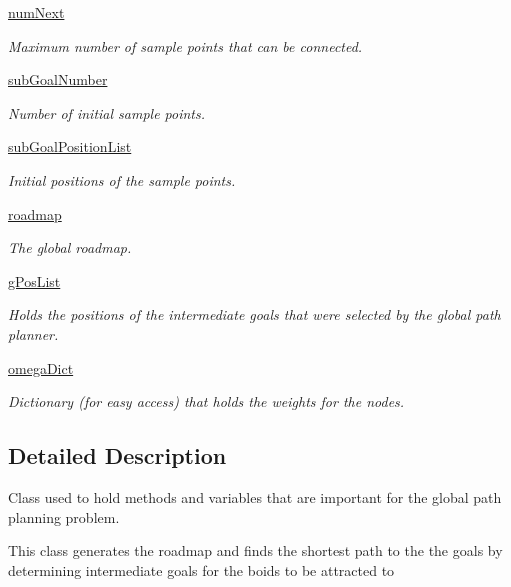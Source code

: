\begin{DoxyCompactItemize}
\hyperlink{classprm_1_1PRMGenerator_a84795d8a1191caae0612ac645d8853b9}{num\-Next}
\begin{DoxyCompactList}\small\item\em Maximum number of sample points that can be connected. \end{DoxyCompactList}\item 
\hyperlink{classprm_1_1PRMGenerator_af8d162e83184c5493019e868e53fcefd}{sub\-Goal\-Number}
\begin{DoxyCompactList}\small\item\em Number of initial sample points. \end{DoxyCompactList}\item 
\hyperlink{classprm_1_1PRMGenerator_a6c5a8c95cfb4636e37404d2f2dce78f8}{sub\-Goal\-Position\-List}
\begin{DoxyCompactList}\small\item\em Initial positions of the sample points. \end{DoxyCompactList}\item 
\hyperlink{classprm_1_1PRMGenerator_a7fa851696426c3e1bbd7ff737cf33538}{roadmap}
\begin{DoxyCompactList}\small\item\em The global roadmap. \end{DoxyCompactList}\item 
\hyperlink{classprm_1_1PRMGenerator_a164c6ae962a75ed31d58eff1db95f141}{g\-Pos\-List}
\begin{DoxyCompactList}\small\item\em Holds the positions of the intermediate goals that were selected by the global path planner. \end{DoxyCompactList}\item 
\hyperlink{classprm_1_1PRMGenerator_ad56b6bb5da1e474ab8a8099863207de3}{omega\-Dict}
\begin{DoxyCompactList}\small\item\em Dictionary (for easy access) that holds the weights for the nodes. \end{DoxyCompactList}\end{DoxyCompactItemize}


\subsection{Detailed Description}
Class used to hold methods and variables that are important for the global path planning problem. 

This class generates the roadmap and finds the shortest path to the the goals by determining intermediate goals for the boids to be attracted to 

